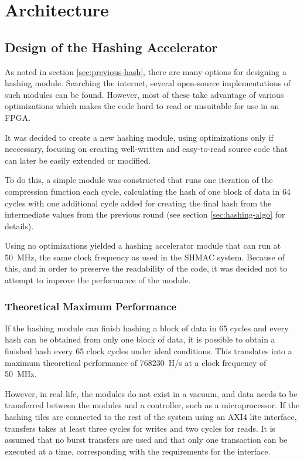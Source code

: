 \chapter{Architecture}

\section{Design of the Hashing Accelerator}

As noted in section \ref{sec:previous-hash}, there are many options for
designing a hashing module. Searching the internet, several open-source
implementations of such modules can be found. However, most of these
take advantage of various optimizations which makes the code hard to
read or unsuitable for use in an FPGA.

It was decided to create a new hashing module, using optimizations only
if neccessary, focusing on creating well-written and easy-to-read source
code that can later be easily extended or modified.

To do this, a simple module was constructed that runs one iteration of
the compression function each cycle, calculating the hash of one block
of data in 64 cycles with one additional cycle added for creating the
final hash from the intermediate values from the previous round (see
section \ref{sec:hashing-algo} for details).

Using no optimizations yielded a hashing accelerator module that can
run at 50~MHz, the same clock frequency as used in the SHMAC system.
Because of this, and in order to preserve the readability of the code, it
was decided not to attempt to improve the performance of the module.

\subsection{Theoretical Maximum Performance}
If the hashing module can finish hashing a block of data in 65 cycles and
every hash can be obtained from only one block of data, it is possible to
obtain a finished hash every 65 clock cycles under ideal conditions. This
translates into a maximum theoretical performance of 768230~H/s at a clock
frequency of 50~MHz.

However, in real-life, the modules do not exist in a vacuum, and data needs to be transferred
between the modules and a controller, such as a microprocessor. If the hashing tiles
are connected to the rest of the system using an AXI4 lite interface, transfers
takes at least three cycles for writes and two cycles for reads.
It is assumed that no burst transfers are used and that only one transaction
can be executed at a time, corresponding with the requirements for the interface.

